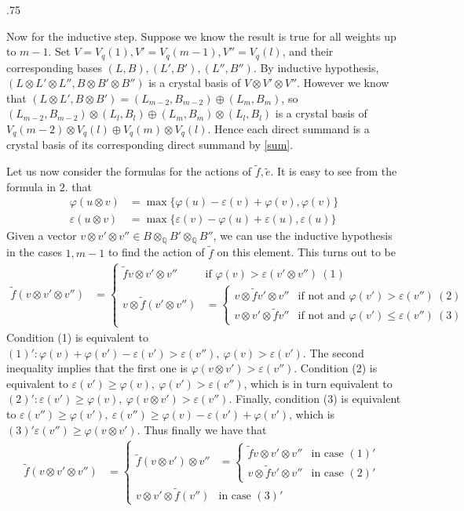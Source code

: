 \documentclass[11pt,fleqn]{article}
\makeatletter
\renewenvironment{proof}[1][\proofname]{\par
  \pushQED{\qed}%
  \normalfont \topsep.75\paraskip\relax
  \trivlist
  \item[\hskip\labelsep
        \itshape
    #1\@addpunct{.}]\ignorespaces
}{%
  \popQED\endtrivlist\@endpefalse
}
\newcommand\QQ{\mathbb Q}
\newcommand\ot{\otimes}
\renewcommand\phi{\varphi}
\makeatother
\begin{document}
\begin{proof}
Now for the inductive step. Suppose we know the result is true for all weights up to
$m-1$. Set $V = V_q(1), V' = V_q(m-1), V'' = V_q(l)$, and their corresponding bases
$(L,B), (L',B'), (L'',B'')$. By inductive hypothesis, $(L \ot L' \ot L'', B \ot B' \ot
B'')$ is a crystal basis of $V \ot V' \ot V''$. However we know that $(L \ot L', B \ot B')
= (L_{m-2},B_{m-2})\oplus(L_{m},B_m)$, so $(L_{m-2},B_{m-2}) \ot (L_l,B_l) \oplus
(L_m,B_m)\ot(L_l,B_l)$ is a crystal basis of $V_q(m-2) \ot V_q(l) \oplus V_q(m) \ot
V_q(l)$. Hence each direct summand is a crystal basis of its corresponding direct summand
by \ref{sum}.

Let us now consider the formulas for the actions of $\tilde f, \tilde e$. It is easy to
see from the formula in $2.$ that 
\begin{align*}
	\phi(u \ot v) &= \max\{\phi(u)-\varepsilon(v)+\phi(v),\phi(v)\}\\
	\varepsilon(u \ot v) &=\max\{\varepsilon(v)-\phi(u)+\varepsilon(u), \varepsilon(u)\}
\end{align*}
Given a vector $v \ot v' \ot v'' \in B \ot_\QQ B' \ot_\QQ B''$, we can use the inductive
hypothesis in the cases $1, m-1$ to find the action of $\tilde f$ on this element. This
turns out to be
\begin{align*}
	\tilde f (v \ot v' \ot v'') &=
		\begin{cases}
			\tilde f v \ot v' \ot v'' & \mbox{if } \phi(v) >
				\varepsilon(v'\ot v'') \ (1)\\
			v \ot \tilde f(v' \ot v'') &=
			\begin{cases}
			v \ot \tilde f v' \ot v'' & \mbox{if not and } \phi(v') > 
				\varepsilon(v'') \ (2)\\
			v \ot v' \ot \tilde f v'' & \mbox{if not and } \phi(v') \leq 
				\varepsilon(v'') \ (3)
			\end{cases}
		\end{cases}
\end{align*}
Condition (1) is equivalent to $(1)': \phi(v) + \phi(v') - \varepsilon(v')> 
\varepsilon(v''), \ \phi(v) > \varepsilon(v')$. The second inequality implies that the
first one is $\phi(v \ot v') > \varepsilon(v'')$. Condition (2) is equivalent to 
$\varepsilon(v') \geq \phi(v), \  \phi(v') > \varepsilon(v'')$, which is in turn equivalent
to $(2)': \varepsilon(v') \geq \phi(v), \  \phi(v \ot v') > \varepsilon(v'')$. Finally,
condition (3) is equivalent to $\varepsilon(v'') \geq \phi(v'), \ \varepsilon(v'')
\geq \phi(v) - \varepsilon(v') + \phi(v')$, which is $(3)' \varepsilon(v'') \geq \phi(v
\ot v')$. Thus finally we have that
\begin{align*}
	\tilde f(v \ot v' \ot v'') &=
		\begin{cases}
			\tilde f(v \ot v') \ot v'' &=
				 \begin{cases}
					\tilde f v \ot v' \ot v'' &\mbox{in case }(1)'\\
					v \ot \tilde f v' \ot v'' &\mbox{in case }(2)'
				 \end{cases}\\
			v \ot v' \ot \tilde f(v'') &\mbox{in case }(3)'
		\end{cases}
\end{align*}




\end{proof}
\end{document}
